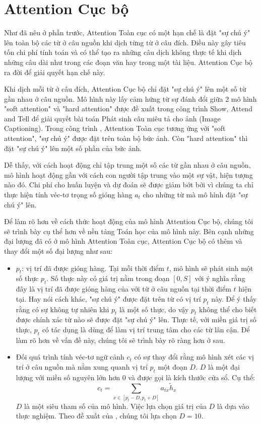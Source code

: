 \section{Attention Cục bộ}
Như đã nêu ở phần trước, Attention Toàn cục có một hạn chế là đặt "sự chú ý" lên toàn bộ các từ ở câu nguồn khi dịch từng từ ở câu đích. Điều này gây tiêu tốn chi phí tính toán và có thể tạo ra những câu dịch không thực tế khi dịch những câu dài như trong các đoạn văn hay trong một tài liệu. Attention Cục bộ ra đời để giải quyết hạn chế này.

Khi dịch mỗi từ ở câu đích, Attention Cục bộ chỉ đặt "sự chú ý" lên một số từ gần nhau ở câu nguồn. Mô hình này lấy cảm hứng từ sự đánh đổi giữa 2 mô hình "soft attention" và "hard attention" được đề xuất trong công trình Show, Attend and Tell \cite{showattendandtellXu2015} để giải quyết bài toán Phát sinh câu miêu tả cho ảnh (Image Captioning). Trong công trình \cite{showattendandtellXu2015}, Attention Toàn cục tương ứng với "soft attention", "sự chú ý" được đặt trên toàn bộ bức ảnh. Còn "hard attention" thì đặt "sự chú ý" lên một số phần của bức ảnh.

Dễ thấy, với cách hoạt động chỉ tập trung một số các từ gần nhau ở câu nguồn, mô hình hoạt động gần với cách con người tập trung vào một sự vật, hiện tượng nào đó. Chi phí cho huấn luyện và dự đoán sẽ được giảm bớt bởi vì chúng ta chỉ thực hiện tính véc-tơ trọng số gióng hàng $a_t$ cho những từ mà mô hình đặt "sự chú ý" lên.

Để làm rõ hơn về cách thức hoạt động của mô hình Attention Cục bộ, chúng tôi sẽ trình bày cụ thể hơn về nền tảng Toán học của mô hình này. Bên cạnh những đại lượng đã có ở mô hình Attention Toàn cục, Attention Cục bộ có thêm và thay đổi một số đại lượng như sau:
\begin{itemize}
	\item $p_t$: vị trí đã được gióng hàng. Tại mỗi thời điểm $t$, mô hình sẽ phát sinh một số thực $p_t$. Số thực này có giá trị nằm trong đoạn $[0, S]$ với ý nghĩa rằng đây là vị trí đã được gióng hàng của với từ ở câu nguồn tại thời điểm $t$ hiện tại. Hay nói cách khác, "sự chú ý" được đặt trên từ có vị trí $p_t$ này. Để ý thấy rằng có sự không tự nhiên khi $p_t$ là một số thực, do vậy $p_t$ không thể cho biết được chính xác từ nào sẽ được đặt "sự chú ý" lên. Thực tế, với miền giá trị số thực, $p_t$ có tác dụng là dùng để làm vị trí trung tâm cho các từ lân cận. Để làm rõ hơn về vấn đề này, chúng tôi sẽ trình bày rõ ràng hơn ở sau.
	\item Đối quá trình tính véc-tơ ngữ cảnh $c_t$ có sự thay đổi rằng mô hình xét các vị trí ở câu nguồn mà nằm xung quanh vị trí $p_t$ một đoạn $D$. $D$ là một đại lượng với miền số nguyên lớn hơn 0 và được gọi là kích thước cửa sổ. Cụ thể:
	\begin{equation}
	c_t = \sum_{x \in [p_t - D, p_t + D]} a_{tx}\tilde{h}_x
	\end{equation}
	$D$ là một siêu tham số của mô hình. Việc lựa chọn giá trị của $D$ là dựa vào thực nghiệm. Theo đề xuất của \cite{attentionThangLuong2015}, chúng tôi lựa chọn $D = 10$.
\end{itemize}

